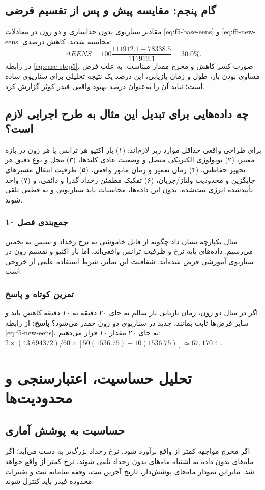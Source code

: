 \documentclass[11pt,a4paper,oneside]{book}
\newcommand{\code}[1]{\lr{\texttt{#1}}}
\newcommand{\summary}[1]{\subsection*{جمع‌بندی فصل #1}}
\newcommand{\exercise}{\subsection*{تمرین کوتاه و پاسخ}}
\newcommand{\answer}{\noindent\textbf{پاسخ:} }
\begin{document}
\section{گام پنجم: مقایسه  پیش و پس از تقسیم فرضی}
مقادیر سناریوی بدون جداسازی و دو زون در معادلات \eqref{eq:f5-base-eens} و \eqref{eq:f5-new-eens} محاسبه شدند. کاهش درصدی:
\begin{equation}
 \Delta EENS=100\frac{111912.1-78338.5}{111912.1}=30.0\%.
 \label{eq:case-step5}
\end{equation}
در رابطه \eqref{eq:case-step5}، صورت کسر کاهش  و مخرج مقدار مبناست. به علت فرض مساوی بودن بار، طول و زمان بازیابی، این درصد یک نتیجه تحلیلی برای سناریوی ساده است؛ نباید آن را به‌عنوان درصد بهبود واقعی فیدر کوثر گزارش کرد.

\section{چه داده‌هایی برای تبدیل این مثال به طرح اجرایی لازم است؟}
برای طراحی واقعی حداقل موارد زیر لازم‌اند: (۱) بار اکتیو هر ترانس یا هر زون در بازه معتبر، (۲) توپولوژی الکتریکی متصل و وضعیت عادی کلیدها، (۳) محل و نوع دقیق هر تجهیز حفاظتی، (۴) زمان تعمیر و زمان مانور واقعی، (۵) ظرفیت انتقال مسیرهای جایگزین و محدودیت ولتاژ/جریان، (۶) تفکیک مطمئن رخداد گذرا و دائمی، و (۷) واحد تأییدشده انرژی ثبت‌شده. بدون این داده‌ها، محاسبات  باید سناریویی و نه قطعی تلقی شوند.

\summary{۱۰}
مثال یکپارچه \code{F5} نشان داد چگونه از فایل خاموشی به نرخ رخداد و سپس به تخمین  می‌رسیم. داده‌های پایه نرخ و ظرفیت ترانس واقعی‌اند، اما بار اکتیو و تقسیم زون در سناریوی آموزشی فرض شده‌اند. شفافیت این تمایز، شرط استفاده علمی از خروجی است.

\exercise
اگر در مثال دو زون، زمان بازیابی بار سالم به جای ۲۰ دقیقه به ۱۰ دقیقه کاهش یابد و سایر فرض‌ها ثابت بمانند،  جدید در سناریوی دو زون چقدر می‌شود؟
\answer از رابطه \eqref{eq:f5-new-eens}، به جای ۲۰ مقدار ۱۰ قرار می‌دهیم:
$2\times(43.6943/2)/60\times[50(1536.75)+10(1536.75)]\simeq67{,}170.4$ .

\chapter{تحلیل حساسیت، اعتبارسنجی و محدودیت‌ها}
\section{حساسیت به پوشش آماری}
اگر مخرج مواجهه کمتر از واقع برآورد شود، نرخ رخداد بزرگ‌تر به دست می‌آید؛ اگر ماه‌های بدون داده به اشتباه ماه‌های بدون رخداد تلقی شوند، نرخ کمتر از واقع خواهد شد. بنابراین نمودار ماه‌های پوشش‌دار، تاریخ آخرین ثبت، وقفه سامانه ثبت و تغییرات محدوده فیدر باید کنترل شوند.
\end{document}
